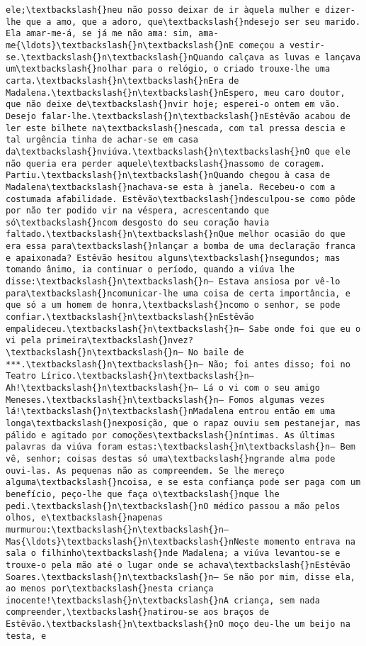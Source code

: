 \documentclass[11pt]{article}
\begin{document}
\begin{Verbatim}[commandchars=\\\{\}]
ele;\textbackslash{}neu não posso deixar de ir àquela mulher e dizer-lhe que a amo, que a adoro, que\textbackslash{}ndesejo ser seu marido. Ela amar-me-á, se já me não ama: sim, ama-me{\ldots}\textbackslash{}n\textbackslash{}nE começou a vestir-se.\textbackslash{}n\textbackslash{}nQuando calçava as luvas e lançava um\textbackslash{}nolhar para o relógio, o criado trouxe-lhe uma carta.\textbackslash{}n\textbackslash{}nEra de Madalena.\textbackslash{}n\textbackslash{}nEspero, meu caro doutor, que não deixe de\textbackslash{}nvir hoje; esperei-o ontem em vão. Desejo falar-lhe.\textbackslash{}n\textbackslash{}nEstêvão acabou de ler este bilhete na\textbackslash{}nescada, com tal pressa descia e tal urgência tinha de achar-se em casa da\textbackslash{}nviúva.\textbackslash{}n\textbackslash{}nO que ele não queria era perder aquele\textbackslash{}nassomo de coragem. Partiu.\textbackslash{}n\textbackslash{}nQuando chegou à casa de Madalena\textbackslash{}nachava-se esta à janela. Recebeu-o com a costumada afabilidade. Estêvão\textbackslash{}ndesculpou-se como pôde por não ter podido vir na véspera, acrescentando que só\textbackslash{}ncom desgosto do seu coração havia faltado.\textbackslash{}n\textbackslash{}nQue melhor ocasião do que era essa para\textbackslash{}nlançar a bomba de uma declaração franca e apaixonada? Estêvão hesitou alguns\textbackslash{}nsegundos; mas tomando ânimo, ia continuar o período, quando a viúva lhe disse:\textbackslash{}n\textbackslash{}n— Estava ansiosa por vê-lo para\textbackslash{}ncomunicar-lhe uma coisa de certa importância, e que só a um homem de honra,\textbackslash{}ncomo o senhor, se pode confiar.\textbackslash{}n\textbackslash{}nEstêvão empalideceu.\textbackslash{}n\textbackslash{}n— Sabe onde foi que eu o vi pela primeira\textbackslash{}nvez?\textbackslash{}n\textbackslash{}n— No baile de ***.\textbackslash{}n\textbackslash{}n— Não; foi antes disso; foi no Teatro Lírico.\textbackslash{}n\textbackslash{}n— Ah!\textbackslash{}n\textbackslash{}n— Lá o vi com o seu amigo Meneses.\textbackslash{}n\textbackslash{}n— Fomos algumas vezes lá!\textbackslash{}n\textbackslash{}nMadalena entrou então em uma longa\textbackslash{}nexposição, que o rapaz ouviu sem pestanejar, mas pálido e agitado por comoções\textbackslash{}níntimas. As últimas palavras da viúva foram estas:\textbackslash{}n\textbackslash{}n— Bem vê, senhor; coisas destas só uma\textbackslash{}ngrande alma pode ouvi-las. As pequenas não as compreendem. Se lhe mereço alguma\textbackslash{}ncoisa, e se esta confiança pode ser paga com um benefício, peço-lhe que faça o\textbackslash{}nque lhe pedi.\textbackslash{}n\textbackslash{}nO médico passou a mão pelos olhos, e\textbackslash{}napenas murmurou:\textbackslash{}n\textbackslash{}n— Mas{\ldots}\textbackslash{}n\textbackslash{}nNeste momento entrava na sala o filhinho\textbackslash{}nde Madalena; a viúva levantou-se e trouxe-o pela mão até o lugar onde se achava\textbackslash{}nEstêvão Soares.\textbackslash{}n\textbackslash{}n— Se não por mim, disse ela, ao menos por\textbackslash{}nesta criança inocente!\textbackslash{}n\textbackslash{}nA criança, sem nada compreender,\textbackslash{}natirou-se aos braços de Estêvão.\textbackslash{}n\textbackslash{}nO moço deu-lhe um beijo na testa, e 
\end{Verbatim}
\end{document}

